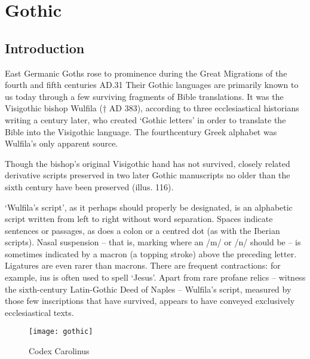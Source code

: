 \def\codex#1{\emph{Codex #1}\index{codex>#1}}
\section{Gothic}

\label{s:gothic}

\subsection{Introduction}

East Germanic Goths rose to prominence during the Great
Migrations of the fourth and fifth centuries AD.31 Their Gothic
languages are primarily known to us today through a few surviving
fragments of Bible translations. It was the Visigothic bishop
Wulfila († AD 383), according to three ecclesiastical historians
writing a century later, who created ‘Gothic letters’ in order to
translate the Bible into the Visigothic language. The fourthcentury
Greek alphabet was Wulfila’s only apparent source.

Though the bishop’s original Visigothic hand has not survived,
closely related derivative scripts preserved in two later Gothic
manuscripts no older than the sixth century have been preserved
(illus. 116).

‘Wulfila’s script’, as it perhaps should properly be designated,
is an alphabetic script written from left to right without word
separation. Spaces indicate sentences or passages, as does a
colon or a centred dot (as with the Iberian scripts). Nasal suspension
– that is, marking where an /m/ or /n/ should be – is
sometimes indicated by a macron (a topping stroke) above the
preceding letter. Ligatures are even rarer than macrons. There
are frequent contractions: for example, ius is often used to spell
‘Jesus’. Apart from rare profane relics – witness the sixth-century
Latin-Gothic Deed of Naples – Wulfila’s script, measured
by those few inscriptions that have survived, appears to have
conveyed exclusively ecclesiastical texts.

\begin{figure}[htb]
\texttt{[image: gothic]}
\caption{Codex Carolinus}
\end{figure}


